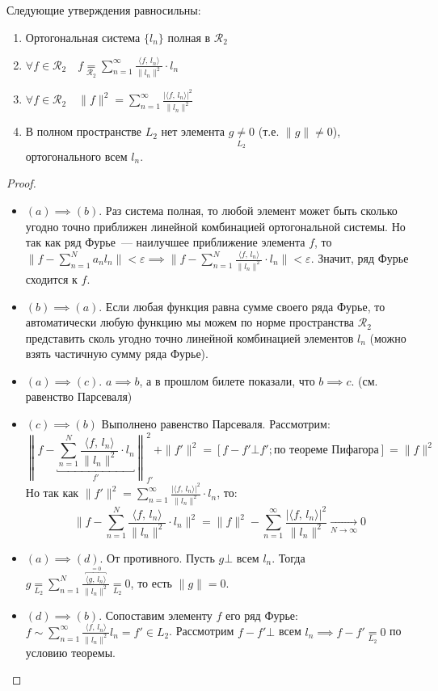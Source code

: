 \begin{theorem*}
    Следующие утверждения равносильны:
    \begin{enumerate}[label=\alph*),leftmargin=*]
        \item Ортогональная система $\{l_n\}$ полная в $\mathcal{R}_2$
        \item $\forall f \in \mathcal{R}_2 \quad f \underset{\mathcal{R}_2}{=} \sum_{n=1}^\infty \frac{\langle f,\, l_n \rangle}{\| l_n \|^2} \cdot l_n$
        \item $\forall f \in \mathcal{R}_2 \quad \| f \|^2 = \sum_{n=1}^\infty \frac{\lvert \langle f,\, l_n \rangle\rvert^2}{\| l_n \|^2}$
        \item В полном пространстве $L_2$ нет элемента $g \underset{L_2}{\neq} 0$ (т.е. $\| g \| \neq 0$), ортогонального всем $l_n$.
    \end{enumerate}
\end{theorem*}
\begin{proof}~
    \begin{itemize}
        \item $(a) \implies (b)$. Раз система полная, то любой элемент может быть сколько угодно точно приближен линейной комбинацией ортогональной системы. Но так как ряд Фурье~--- наилучшее приближение элемента $f$, то $\| f - \sum_{n=1}^N a_n l_n \| < \varepsilon \implies \| f - \sum_{n=1}^N \frac{\langle f,\, l_n \rangle}{\| l_n \|^2} \cdot l_n \| < \varepsilon$. Значит, ряд Фурье сходится к $f$.
        \item $(b) \implies (a)$. Если любая функция равна сумме своего ряда Фурье, то автоматически любую функцию мы можем по норме пространства $\mathcal{R}_2$ представить сколь угодно точно линейной комбинацией элементов $l_n$ (можно взять частичную сумму ряда Фурье).
        \item $(a) \implies (c)$. $a \implies b$, а в прошлом билете показали, что $b \implies c$. (см. равенство Парсеваля)
        \item $(c) \implies (b)$ Выполнено равенство Парсеваля. Рассмотрим:
        \[\left\| f - \underbracket{\sum_{n=1}^N \frac{\langle f,\, l_n \rangle}{\| l_n \|^2} \cdot l_n}_{f'} \right\|^2_{f'} + \| f' \|^2 = [f - f' \bot f'; \text{по теореме Пифагора}] = \| f \|^2\]
        Но так как $\| f' \|^2 = \sum_{n=1}^\infty \frac{\lvert \langle f,\, l_n \rangle\rvert^2}{\| l_n \|^2} \cdot l_n$, то:
        \[\| f - \sum_{n=1}^N \frac{\langle f,\, l_n \rangle}{\| l_n \|^2} \cdot l_n \|^2 = \| f \|^2 - \sum_{n=1}^\infty \frac{\lvert \langle f,\, l_n \rangle\rvert^2}{\| l_n \|^2} \xrightarrow[N \to \infty]{} 0\]
        \item $(a) \implies (d)$. От противного. Пусть $g \bot $ всем $l_n$. Тогда $g \underset{L_2}{=}  \sum_{n=1}^N \frac{ \overbracket{\langle g,\, l_n \rangle}^{=0}}{\| l_n \|^2} \underset{L_2}{=} 0$, то есть $\| g\| = 0$.
        \item $(d) \implies (b)$. Сопоставим элементу $f$ его ряд Фурье: $f \sim \sum_{n=1}^\infty \frac{\langle f,\, l_n \rangle}{\| l_n \|^2} l_n = f' \in L_2$.
        Рассмотрим $f - f' \bot$ всем $l_n \implies f - f' \underset{L_2}{=} 0$ по условию теоремы.
    \end{itemize}
\end{proof}
